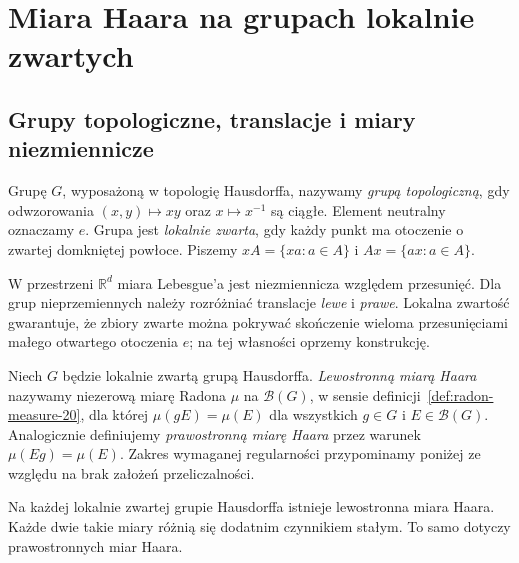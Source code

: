 \chapter{Miara Haara na grupach lokalnie zwartych}
\label{ch:haar-23}

\section{Grupy topologiczne, translacje i miary niezmiennicze}
\begin{definicja}
\label{def:topological-group-23}
Grupę $G$, wyposażoną w topologię Hausdorffa, nazywamy
\emph{grupą topologiczną}, gdy odwzorowania $(x,y)\mapsto xy$
oraz $x\mapsto x^{-1}$ są ciągłe. Element neutralny oznaczamy $e$.
Grupa jest \emph{lokalnie zwarta}, gdy każdy punkt ma otoczenie
o zwartej domkniętej powłoce. Piszemy $xA=\{xa:a\in A\}$
i $Ax=\{ax:a\in A\}$.
\end{definicja}

\begin{uwaga}
W przestrzeni $\mathbb R^d$ miara Lebesgue'a jest niezmiennicza
względem przesunięć. Dla grup nieprzemiennych należy rozróżniać
translacje \emph{lewe} i \emph{prawe}. Lokalna zwartość gwarantuje,
że zbiory zwarte można pokrywać skończenie wieloma przesunięciami
małego otwartego otoczenia $e$; na tej własności oprzemy konstrukcję.
\end{uwaga}

\begin{definicja}
\label{def:haar-23}
Niech $G$ będzie lokalnie zwartą grupą Hausdorffa.
\emph{Lewostronną miarą Haara} nazywamy niezerową miarę Radona
$\mu$ na $\mathcal B(G)$, w sensie definicji~\ref{def:radon-measure-20},
dla której $\mu(gE)=\mu(E)$ dla wszystkich $g\in G$
i $E\in\mathcal B(G)$. Analogicznie definiujemy
\emph{prawostronną miarę Haara} przez warunek
$\mu(Eg)=\mu(E)$. Zakres wymaganej regularności
przypominamy poniżej ze względu na brak założeń przeliczalności.
\end{definicja}

\begin{twierdzenie}
\label{thm:haar-main-23}
Na każdej lokalnie zwartej grupie Hausdorffa istnieje
lewostronna miara Haara. Każde dwie takie miary różnią się
dodatnim czynnikiem stałym. To samo dotyczy prawostronnych miar
Haara.
\end{twierdzenie}

